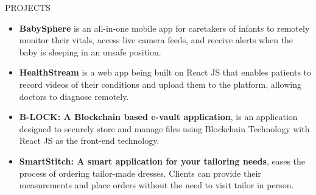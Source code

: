 \documentclass{resume} %
\begin{document}
\begin{rSection}{PROJECTS}
    \begin{itemize}
        \item \textbf{BabySphere} is an all-in-one mobile app for caretakers of infants to remotely monitor their vitals, access live camera feeds, and receive alerts when the baby is sleeping in an unsafe position.
        \item \textbf{HealthStream} is a web app being built on React JS that enables patients to record videos of their conditions and upload them to the platform, allowing doctors to diagnose remotely.

        \item \textbf{B-LOCK: A Blockchain based e-vault application}{, is an application designed to securely store and manage files using Blockchain Technology with React JS as the front-end technology.
              }


        \item \textbf{SmartStitch: A smart application for your tailoring needs}{, eases the process of ordering tailor-made dresses. Clients can provide their measurements and place orders without the need to visit tailor in person.}





\end{itemize}
\end{rSection}
\end{document}
